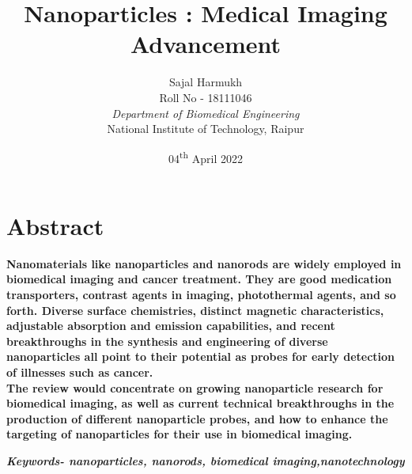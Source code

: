 \documentclass[12pt]{article}
\title{\textbf{Nanoparticles : Medical Imaging Advancement}}
\author{Sajal Harmukh \\ Roll No - 18111046 \\ \textit{Department of Biomedical Engineering} \\ National Institute of Technology, Raipur }
\date{04\textsuperscript{th} April 2022}
\begin{document}
\maketitle

\section*{Abstract}
\textbf{Nanomaterials like nanoparticles and nanorods are widely employed in biomedical imaging and cancer treatment. They are good medication transporters, contrast agents in imaging, photothermal agents, and so forth. Diverse surface chemistries, distinct magnetic characteristics, adjustable absorption and emission capabilities, and recent breakthroughs in the synthesis and engineering of diverse nanoparticles all point to their potential as probes for early detection of illnesses such as cancer. \\The review would concentrate on growing nanoparticle research for biomedical imaging, as well as current technical breakthroughs in the production of different nanoparticle probes, and how to enhance the targeting of nanoparticles for their use in biomedical imaging. }

\textbf{\textit{Keywords- nanoparticles, nanorods, biomedical imaging,nanotechnology}} 
\end{document}
